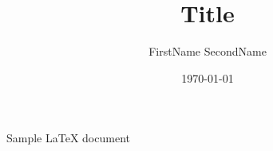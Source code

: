 \documentclass[12pt, letterpaper, twoside]{article}
\title{Title}
\author{FirstName SecondName}
\date{\today}
\begin{document}
\maketitle

Sample \LaTeX{} document
\end{document}
